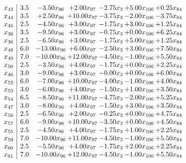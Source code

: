 \documentclass[8pt]{article}
\begin{document}
\[\begin{array}{c| c c@{\hskip 2pt} c@{\hskip 2pt} c@{\hskip 2pt} c@{\hskip 2pt} c@{\hskip 2pt} }
 x_{43}   &  3.5 & -3.50 x_{96} & +  2.00 x_{97} & -2.75 x_{3} & +  5.00 x_{106} & +  0.25 x_{84}\\
 x_{44}   &  3.5 & +  2.50 x_{96} & + 10.00 x_{97} & -3.75 x_{3} & -2.00 x_{106} & -3.75 x_{84}\\
 x_{45}   &  2.5 & -4.50 x_{96} & +  3.00 x_{97} & -1.75 x_{3} & +  3.00 x_{106} & +  1.25 x_{84}\\
 x_{30}   &  3.5 & -9.50 x_{96} & +  3.00 x_{97} & -0.75 x_{3} & +  0.00 x_{106} & +  6.25 x_{84}\\
 x_{36}   &  2.5 & -6.50 x_{96} & +  3.00 x_{97} & -1.75 x_{3} & +  5.00 x_{106} & +  1.25 x_{84}\\
 x_{48}   &  6.0 & -13.00 x_{96} & +  6.00 x_{97} & -2.50 x_{3} & +  3.00 x_{106} & +  7.50 x_{84}\\
 x_{49}   &  7.0 & -10.00 x_{96} & + 12.00 x_{97} & -4.50 x_{3} & -1.00 x_{106} & +  5.50 x_{84}\\
 x_{50}   &  2.5 & -3.50 x_{96} & +  4.00 x_{97} & -1.75 x_{3} & +  0.00 x_{106} & +  2.25 x_{84}\\
 x_{46}   &  3.0 & -9.00 x_{96} & +  3.00 x_{97} & -0.00 x_{3} & +  0.00 x_{106} & +  6.00 x_{84}\\
 x_{52}   &  6.0 & -7.00 x_{96} & + 10.00 x_{97} & -4.00 x_{3} & -1.00 x_{106} & +  4.00 x_{84}\\
 x_{53}   &  3.0 & -6.00 x_{96} & +  4.00 x_{97} & -1.50 x_{3} & +  1.00 x_{106} & +  3.50 x_{84}\\
 x_{54}   &  6.5 & -8.50 x_{96} & + 11.00 x_{97} & -4.75 x_{3} & -2.00 x_{106} & +  5.25 x_{84}\\
 x_{47}   &  3.0 & -8.00 x_{96} & +  4.00 x_{97} & -1.50 x_{3} & +  3.00 x_{106} & +  3.50 x_{84}\\
 x_{56}   &  2.5 & -6.50 x_{96} & +  2.00 x_{97} & -0.25 x_{3} & +  0.00 x_{106} & +  4.75 x_{84}\\
 x_{57}   &  6.0 & -9.00 x_{96} & + 10.00 x_{97} & -3.50 x_{3} & +  0.00 x_{106} & +  4.50 x_{84}\\
 x_{55}   &  2.5 & -4.50 x_{96} & +  4.00 x_{97} & -1.75 x_{3} & +  1.00 x_{106} & +  2.25 x_{84}\\
 x_{59}   &  7.0 & -10.00 x_{96} & + 11.00 x_{97} & -4.50 x_{3} & -1.00 x_{106} & +  5.50 x_{84}\\
 x_{60}   &  2.5 & -5.50 x_{96} & +  4.00 x_{97} & -1.75 x_{3} & +  2.00 x_{106} & +  2.25 x_{84}\\
 x_{61}   &  7.0 & -10.00 x_{96} & + 12.00 x_{97} & -4.50 x_{3} & -1.00 x_{106} & +  5.50 x_{84}\\

\end{array}\]
\end{document}
